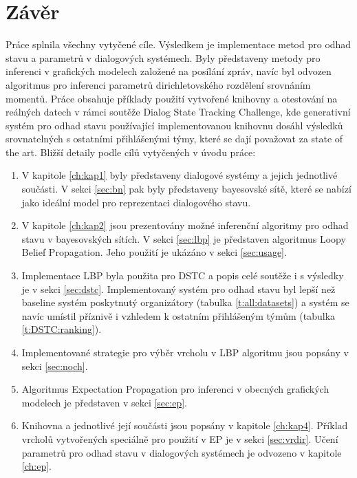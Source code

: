 \chapter*{Závěr}

Práce splnila všechny vytyčené cíle.
Výsledkem je implementace metod pro odhad stavu a parametrů v dialogových systémech.
Byly představeny metody pro inferenci v grafických modelech založené na posílání zpráv, navíc byl odvozen algoritmus pro inferenci parametrů dirichletovského rozdělení srovnáním momentů.
Práce obsahuje příklady použití vytvořené knihovny a otestování na reálných datech v rámci soutěže Dialog State Tracking Challenge, kde generativní systém pro odhad stavu používající implementovanou knihovnu dosáhl výsledků srovnatelných s ostatními přihlášenými týmy, které se dají považovat za state of the art.
Bližší detaily podle cílů vytyčených v úvodu práce:
\begin{enumerate}

\item V kapitole \ref{ch:kap1} byly představeny dialogové systémy a jejich jednotlivé součásti.
V sekci \ref{sec:bn} pak byly představeny bayesovské sítě, které se nabízí jako ideální model pro reprezentaci dialogového stavu.

\item V kapitole \ref{ch:kap2} jsou prezentovány možné inferenční algoritmy pro odhad stavu v bayesovských sítích.
V sekci \ref{sec:lbp} je představen algoritmus Loopy Belief Propagation.
Jeho použití je ukázáno v sekci \ref{sec:usage}.

\item Implementace LBP byla použita pro DSTC a popis celé soutěže i s výsledky je v sekci \ref{sec:dstc}.
Implementovaný systém pro odhad stavu byl lepší než baseline systém poskytnutý organizátory (tabulka \ref{t:all:datasets}) a systém se navíc umístil příznivě i vzhledem k ostatním přihlášeným týmům (tabulka \ref{t:DSTC:ranking}).

\item Implementované strategie pro výběr vrcholu v LBP algoritmu jsou popsány v sekci \ref{sec:noch}.

\item Algoritmus Expectation Propagation pro inferenci v obecných grafických modelech je představen v sekci \ref{sec:ep}.

\item Knihovna a jednotlivé její součásti jsou popsány v kapitole \ref{ch:kap4}.
Příklad vrcholů vytvořených speciálně pro použití v EP je v sekci \ref{sec:vrdir}.
Učení parametrů pro odhad stavu v dialogových systémech je odvozeno v kapitole \ref{ch:ep}.
\end{enumerate}
